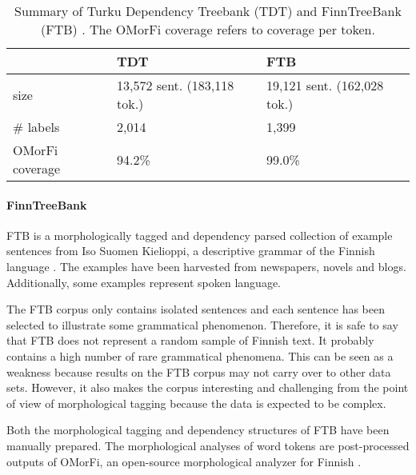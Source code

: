 \begin{table}[htb!]
\begin{center}
\begin{tabular}{l|l|l} 
 & TDT & FTB \\
\hline
size & 13,572 sent. (183,118 tok.) & 19,121 sent. (162,028 tok.) \\
\# labels & 2,014 & 1,399 \\
OMorFi coverage & 94.2\% & 99.0\% \\
\end{tabular}
\end{center}
\caption{Summary of Turku Dependency Treebank (TDT) \citep{Haverinen2013} and FinnTreeBank (FTB) \citep{Voutilainen2011}. The OMorFi coverage refers to coverage per token.}
\label{tab:data} 
\end{table}

\paragraph{FinnTreeBank}
FTB is a morphologically tagged and dependency parsed collection of
example sentences from Iso Suomen Kielioppi, a descriptive grammar of
the Finnish language \citep{Hakulinen2004}. The examples have been
harvested from newspapers, novels and blogs. Additionally, some
examples represent spoken language. 

The FTB corpus only contains isolated sentences and each sentence has
been selected to illustrate some grammatical phenomenon. Therefore, it
is safe to say that FTB does not represent a random sample of Finnish
text. It probably contains a high number of rare grammatical
phenomena. This can be seen as a weakness because results on the FTB
corpus may not carry over to other data sets. However, it also makes
the corpus interesting and challenging from the point of view of
morphological tagging because the data is expected to be complex.

Both the morphological tagging and dependency structures of FTB have
been manually prepared.  The morphological analyses of word tokens are
post-processed outputs of OMorFi, an open-source morphological
analyzer for Finnish
\citep{Pirinen2011}. %

